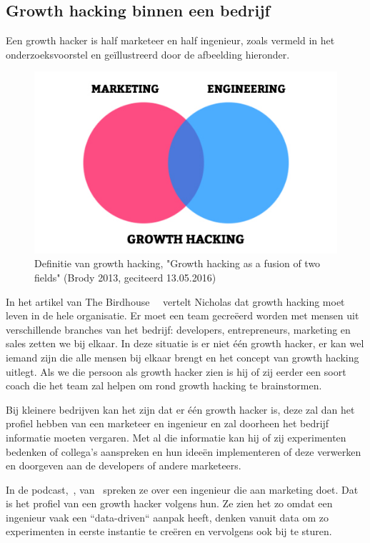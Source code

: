 \subsection{Growth hacking binnen een bedrijf} \label{sec:growth-hacker-functie}
Een growth hacker is half marketeer en half ingenieur, zoals vermeld in het onderzoeksvoorstel en geïllustreerd door de afbeelding hieronder.
\begin{figure}[h!]
	\includegraphics[width=\linewidth]{img/growth-hacker-definition.jpg}
	\centering
	\caption{Definitie van growth hacking, "Growth hacking as a fusion of two fields"  (Brody 2013, geciteerd 13.05.2016)}
	\label{fig:defGrowthHacker}
\end{figure}

In het artikel van The Birdhouse~\autocite{Birdhouse2019}~ vertelt Nicholas dat growth hacking moet leven in de hele organisatie. Er moet een team gecreëerd worden met mensen uit verschillende branches van het bedrijf: developers, entrepreneurs, marketing en sales zetten we bij elkaar. In deze situatie is er niet één growth hacker, er kan wel iemand zijn die alle mensen bij elkaar brengt en het concept van growth hacking uitlegt. Als we die persoon als growth hacker zien is hij of zij eerder een soort coach die het team zal helpen om rond growth hacking te brainstormen.

Bij kleinere bedrijven kan het zijn dat er één growth hacker is, deze zal dan het profiel hebben van een marketeer en ingenieur en zal doorheen het bedrijf informatie moeten vergaren. Met al die informatie kan hij of zij experimenten bedenken of collega's aanspreken en hun ideeën implementeren of deze verwerken en doorgeven aan de developers of andere marketeers. 

In de podcast,~, van~\autocite{fizzle.co2015} spreken ze over een ingenieur die aan marketing doet. Dat is het profiel van een growth hacker volgens hun. Ze zien het zo omdat een ingenieur vaak een ``data-driven`` aanpak heeft, denken vanuit data om zo experimenten in eerste instantie te creëren en vervolgens ook bij te sturen. 


